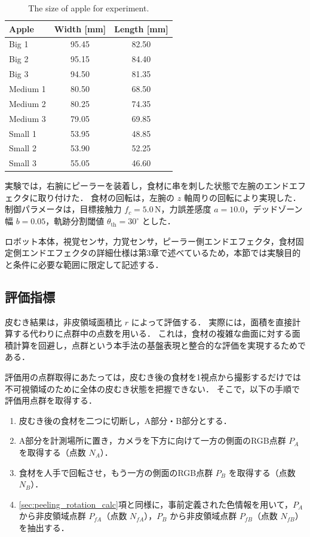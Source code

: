 \begin{table}[ht]
  \centering
  \caption{The size of apple for experiment.}
  \label{tab:peeling_apple_sizes}
  \begin{tabular}{@{}lcc@{}}
    \toprule
    Apple & Width [mm] & Length [mm] \\
    \midrule
    Big 1 & 95.45 & 82.50 \\
    Big 2 & 95.15 & 84.40 \\
    Big 3 & 94.50 & 81.35 \\
    Medium 1 & 80.50 & 68.50 \\
    Medium 2 & 80.25 & 74.35 \\
    Medium 3 & 79.05 & 69.85 \\
    Small 1 & 53.95 & 48.85 \\
    Small 2 & 53.90 & 52.25 \\
    Small 3 & 55.05 & 46.60 \\
    \bottomrule
  \end{tabular}
\end{table}

実験では，右腕にピーラーを装着し，食材に串を刺した状態で左腕のエンドエフェクタに取り付けた．
食材の回転は，左腕の $z$ 軸周りの回転により実現した．
制御パラメータは，目標接触力 $f_c = 5.0$\,N，力誤差感度 $a = 10.0$，デッドゾーン幅 $b = 0.05$，軌跡分割閾値 $\theta_{\mathrm{th}} = 30^\circ$ とした．

ロボット本体，視覚センサ，力覚センサ，ピーラー側エンドエフェクタ，食材固定側エンドエフェクタの詳細仕様は第3章で述べているため，本節では実験目的と条件に必要な範囲に限定して記述する．

\subsection{評価指標}

皮むき結果は，非皮領域面積比 $r$ によって評価する．
実際には，面積を直接計算する代わりに点群中の点数を用いる．
これは，食材の複雑な曲面に対する面積計算を回避し，点群という本手法の基盤表現と整合的な評価を実現するためである．

評価用の点群取得にあたっては，皮むき後の食材を1視点から撮影するだけでは不可視領域のために全体の皮むき状態を把握できない．
そこで，以下の手順で評価用点群を取得する．

\begin{enumerate}
  \item 皮むき後の食材を二つに切断し，A部分・B部分とする．
  \item A部分を計測場所に置き，カメラを下方に向けて一方の側面のRGB点群 $P_A$ を取得する（点数 $N_A$）．
  \item 食材を人手で回転させ，もう一方の側面のRGB点群 $P_B$ を取得する（点数 $N_B$）．
  \item \ref{sec:peeling_rotation_calc}項と同様に，事前定義された色情報を用いて，$P_A$ から非皮領域点群 $P_{fA}$（点数 $N_{fA}$），$P_B$ から非皮領域点群 $P_{fB}$（点数 $N_{fB}$）を抽出する．
\end{enumerate}

